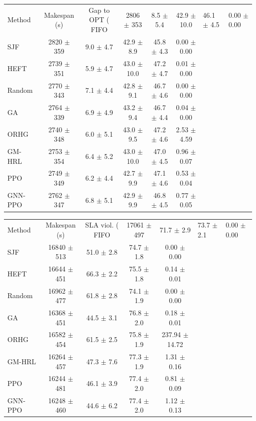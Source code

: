 \begin{tabular}{lccccc}
\toprule
Method & Makespan (s) & Gap to OPT (%
\midrule
FIFO & 2806 $\pm$ 353 & 8.5 $\pm$ 5.4 & 42.9 $\pm$ 10.0 & 46.1 $\pm$ 4.5 & 0.00 $\pm$ 0.00 \\
SJF & 2820 $\pm$ 359 & 9.0 $\pm$ 4.7 & 42.9 $\pm$ 8.9 & 45.8 $\pm$ 4.3 & 0.00 $\pm$ 0.00 \\
HEFT & 2739 $\pm$ 351 & 5.9 $\pm$ 4.7 & 43.0 $\pm$ 10.0 & 47.2 $\pm$ 4.7 & 0.01 $\pm$ 0.00 \\
Random & 2770 $\pm$ 343 & 7.1 $\pm$ 4.4 & 42.8 $\pm$ 9.1 & 46.7 $\pm$ 4.6 & 0.00 $\pm$ 0.00 \\
GA & 2764 $\pm$ 339 & 6.9 $\pm$ 4.9 & 43.2 $\pm$ 9.4 & 46.7 $\pm$ 4.4 & 0.04 $\pm$ 0.00 \\
ORHG & 2740 $\pm$ 348 & 6.0 $\pm$ 5.1 & 43.0 $\pm$ 9.5 & 47.2 $\pm$ 4.6 & 2.53 $\pm$ 4.59 \\
GM-HRL & 2753 $\pm$ 354 & 6.4 $\pm$ 5.2 & 43.0 $\pm$ 10.0 & 47.0 $\pm$ 4.5 & 0.96 $\pm$ 0.07 \\
PPO & 2749 $\pm$ 349 & 6.2 $\pm$ 4.4 & 42.7 $\pm$ 9.9 & 47.1 $\pm$ 4.6 & 0.53 $\pm$ 0.04 \\
GNN-PPO & 2762 $\pm$ 347 & 6.8 $\pm$ 5.1 & 42.9 $\pm$ 9.9 & 46.8 $\pm$ 4.5 & 0.77 $\pm$ 0.05 \\
\bottomrule
\end{tabular}

\begin{tabular}{lcccc}
\toprule
Method & Makespan (s) & SLA viol. (%
\midrule
FIFO & 17061 $\pm$ 497 & 71.7 $\pm$ 2.9 & 73.7 $\pm$ 2.1 & 0.00 $\pm$ 0.00 \\
SJF & 16840 $\pm$ 513 & 51.0 $\pm$ 2.8 & 74.7 $\pm$ 1.8 & 0.00 $\pm$ 0.00 \\
HEFT & 16644 $\pm$ 451 & 66.3 $\pm$ 2.2 & 75.5 $\pm$ 1.8 & 0.14 $\pm$ 0.01 \\
Random & 16962 $\pm$ 477 & 61.8 $\pm$ 2.8 & 74.1 $\pm$ 1.9 & 0.00 $\pm$ 0.00 \\
GA & 16368 $\pm$ 451 & 44.5 $\pm$ 3.1 & 76.8 $\pm$ 2.0 & 0.18 $\pm$ 0.01 \\
ORHG & 16582 $\pm$ 454 & 61.5 $\pm$ 2.5 & 75.8 $\pm$ 1.9 & 237.94 $\pm$ 14.72 \\
GM-HRL & 16264 $\pm$ 457 & 47.3 $\pm$ 7.6 & 77.3 $\pm$ 1.9 & 1.31 $\pm$ 0.16 \\
PPO & 16244 $\pm$ 481 & 46.1 $\pm$ 3.9 & 77.4 $\pm$ 2.0 & 0.81 $\pm$ 0.09 \\
GNN-PPO & 16248 $\pm$ 460 & 44.6 $\pm$ 6.2 & 77.4 $\pm$ 2.0 & 1.12 $\pm$ 0.13 \\
\bottomrule
\end{tabular}
